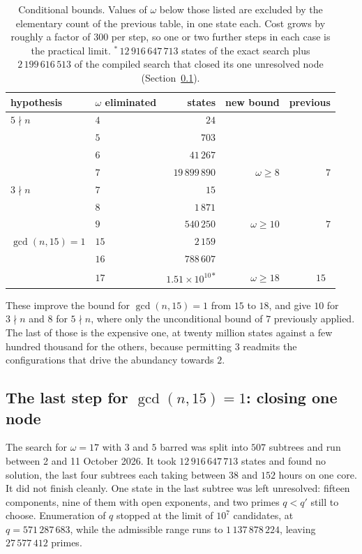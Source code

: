 \documentclass[11pt]{amsart}
\theoremstyle{remark}
\begin{document}
\begin{table}[h]
\centering
\begin{tabular}{llrrr}
\toprule
hypothesis & $\omega$ eliminated & states & new bound & previous \\
\midrule
$5 \nmid n$          & $4$  & $24$ & & \\
                     & $5$  & $703$ & & \\
                     & $6$  & $41\,267$ & & \\
                     & $7$  & $19\,899\,890$ & $\omega \ge 8$ & $7$ \\
\midrule
$3 \nmid n$          & $7$  & $15$ & & \\
                     & $8$  & $1\,871$ & & \\
                     & $9$  & $540\,250$ & $\omega \ge 10$ & $7$ \\
\midrule
$\gcd(n,15) = 1$     & $15$ & $2\,159$ & & \\
                     & $16$ & $788\,607$ & & \\
                     & $17$ & $1.51 \times 10^{10}$\textsuperscript{$*$} & $\omega \ge 18$ & $15$~\cite{prasad} \\
\bottomrule
\end{tabular}
\caption{Conditional bounds. Values of $\omega$ below those listed are excluded
by the elementary count of the previous table, in one state each. Cost grows by
roughly a factor of $300$ per step, so one or two further steps in each case is
the practical limit. ${}^{*}$\,$12\,916\,647\,713$ states of the exact search
plus $2\,199\,616\,513$ of the compiled search that closed its one unresolved
node (Section~\ref{sec:omega17}).}
\end{table}

These improve the bound for $\gcd(n,15) = 1$ from $15$ to $18$, and give $10$ for
$3 \nmid n$ and $8$ for $5 \nmid n$, where only the unconditional bound of $7$
previously applied. The last of those is the expensive one, at twenty million
states against a few hundred thousand for the others, because permitting $3$
readmits the configurations that drive the abundancy towards $2$.

\subsection{The last step for $\gcd(n,15) = 1$: closing one node}\label{sec:omega17}
The search for $\omega = 17$ with $3$ and $5$ barred was split into $507$
subtrees and run between 2 and 11 October 2026. It took $12\,916\,647\,713$
states and found no solution, the last four subtrees each taking between $38$
and $152$ hours on one core. It did not finish cleanly. One state in the last
subtree was left unresolved: fifteen components, nine of them with open
exponents, and two primes $q < q'$ still to choose. Enumeration of $q$ stopped
at the limit of $10^{7}$ candidates, at $q = 571\,287\,683$, while the
admissible range runs to $1\,137\,878\,224$, leaving $27\,577\,412$ primes.
\end{document}
